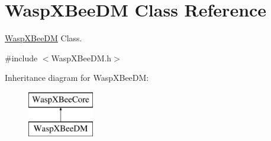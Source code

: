 \hypertarget{class_wasp_x_bee_d_m}{}\section{Wasp\+X\+Bee\+DM Class Reference}
\label{class_wasp_x_bee_d_m}


\hyperlink{class_wasp_x_bee_d_m}{Wasp\+X\+Bee\+DM} Class.  




{\ttfamily \#include $<$Wasp\+X\+Bee\+D\+M.\+h$>$}

Inheritance diagram for Wasp\+X\+Bee\+DM\+:\begin{figure}[H]
\begin{center}
\leavevmode
\includegraphics[height=2.000000cm]{class_wasp_x_bee_d_m}
\end{center}
\end{figure}
